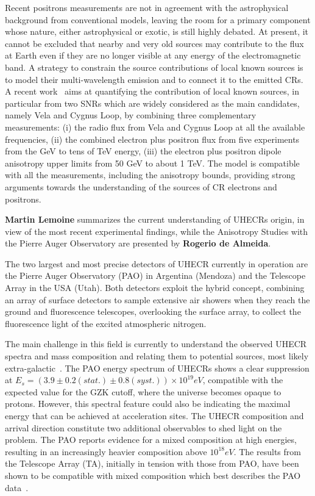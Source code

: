 \documentclass{PoS}
\begin{document}
Recent positrons measurements are not in agreement with the astrophysical background from conventional models, leaving the room for a primary component whose nature, either astrophysical or exotic, is still highly debated. At present, it cannot be excluded that nearby and
very old sources may contribute to the flux at Earth even if they are no longer visible at any
energy of the electromagnetic band. A strategy to constrain the source contributions of local
known sources is to model their multi-wavelength emission and to connect it to the emitted
CRs. A recent work~\cite{Manconi:2018azw} aims at  quantifying the contribution of local known
sources, in particular from two SNRs which are widely considered as the main candidates, namely Vela and Cygnus Loop, by combining three complementary measurements: (i) the radio flux from Vela and Cygnus Loop at all the available frequencies, (ii) the combined electron plus positron flux from five experiments from the GeV to tens of TeV energy, (iii) the electron plus positron dipole anisotropy upper limits from 50 GeV to about 1 TeV. 
The model is compatible with all the measurements, including the anisotropy bounds, providing strong arguments towards the understanding of the sources of CR electrons and positrons. 


{\bf Martin Lemoine} summarizes the current understanding of UHECRs origin, in view of the most recent experimental findings, while the Anisotropy Studies with the Pierre Auger Observatory are presented by {\bf Rogerio de Almeida}.

The two largest and most precise detectors of UHECR currently in operation are the
Pierre Auger Observatory (PAO) in Argentina (Mendoza) and the Telescope Array in the
USA (Utah). Both detectors exploit the hybrid concept, combining an array of
surface detectors to sample extensive air showers when they reach the ground and
fluorescence telescopes, overlooking the surface array, to collect the fluorescence light of the excited atmospheric nitrogen. 

The main challenge in this field is currently to understand the observed UHECR spectra and mass composition and relating them to potential sources, most likely extra-galactic~\cite{Aloisio}. 
The PAO energy spectrum of UHECRs shows a clear suppression at $E_{s} = (3.9 \pm 0.2(stat.) \pm
0.8(syst.)) \times 10^{19} eV$, compatible with the expected value for the GZK cutoff, where the universe becomes opaque to protons. However, this spectral feature could also be indicating the maximal energy that can be achieved at acceleration sites. 
The UHECR composition and arrival direction constitute two additional observables to shed light on the problem. The PAO reports evidence for a mixed composition at high energies, resulting in an increasingly heavier composition above $10^{18} eV$. The results from the Telescope Array (TA), initially in tension with those from PAO, have been shown to be compatible with mixed composition which best describes the PAO data~\cite{vitor}. 
\end{document}
